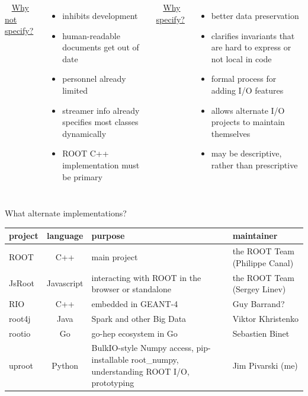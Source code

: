 \documentclass[aspectratio=169]{beamer}
\begin{document}
\begin{frame}{}
\vspace{1 cm}
\begin{columns}[t]
\mbox{ } \hfill \underline{\large Why not specify?} \hfill \mbox{ }

\vspace{0.25 cm}
\begin{itemize}
\item inhibits development
\item human-readable documents get out of date
\item personnel already limited
\item streamer info already specifies most classes dynamically
\item ROOT C++ implementation must be primary
\end{itemize}

\mbox{ } \hfill \underline{\large Why specify?} \hfill \mbox{ }

\vspace{0.25 cm}
\begin{itemize}
\item better data preservation
\item clarifies invariants that are hard to express or not local in code
\item formal process for adding I/O features
\item allows alternate I/O projects to maintain themselves
\item may be descriptive, rather than prescriptive
\end{itemize}

\end{columns}
\end{frame}

\begin{frame}{What alternate implementations?}
\begin{center}
\renewcommand{\arraystretch}{1.5}
\begin{tabular}{l c p{4.5 cm} l}
project & language & purpose & maintainer \\\hline
ROOT & C++ & main project & the ROOT Team (Philippe Canal) \\
JsRoot & Javascript & interacting with ROOT in the browser or standalone & the ROOT Team (Sergey Linev) \\
RIO & C++ & embedded in GEANT-4 & Guy Barrand? \\
root4j & Java & Spark and other Big Data & Viktor Khristenko \\
rootio & Go & go-hep ecosystem in Go & Sebastien Binet \\
uproot & Python & BulkIO-style Numpy access, pip-installable root\_numpy, understanding ROOT I/O, prototyping & Jim Pivarski (me)
\end{tabular}
\end{center}
\end{frame}
\end{document}
